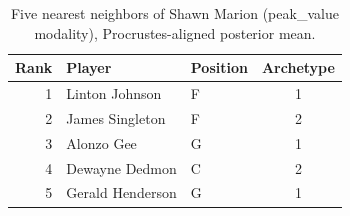 \begin{table}[htbp]
  \centering\small
  \begin{tabular}{rllc}
    \toprule
    Rank & Player & Position & Archetype \\
    \midrule
    1 & Linton Johnson & F & 1 \\
    2 & James Singleton & F & 2 \\
    3 & Alonzo Gee & G & 1 \\
    4 & Dewayne Dedmon & C & 2 \\
    5 & Gerald Henderson & G & 1 \\
    \bottomrule
  \end{tabular}
  \caption{Five nearest neighbors of Shawn Marion (peak_value modality), Procrustes-aligned posterior mean.}
  \label{tab:Shawn_Marion_neighbors_peak_value}
\end{table}

